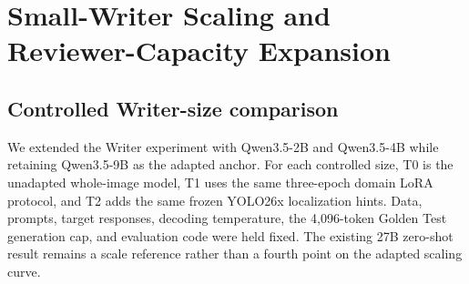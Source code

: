 
\section{Small-Writer Scaling and Reviewer-Capacity Expansion}

\subsection{Controlled Writer-size comparison}

We extended the Writer experiment with Qwen3.5-2B and Qwen3.5-4B while
retaining Qwen3.5-9B as the adapted anchor. For each controlled size, T0 is the
unadapted whole-image model, T1 uses the same three-epoch domain LoRA protocol,
and T2 adds the same frozen YOLO26x localization hints. Data, prompts, target
responses, decoding temperature, the 4,096-token Golden Test generation cap,
and evaluation code were held fixed. The existing 27B zero-shot result remains
a scale reference rather than a fourth point on the adapted scaling curve.

\begin{table}[H]
\centering
\scriptsize
\setlength{\tabcolsep}{2.0pt}
\caption{Controlled Writer-size results on the 1,000-image Golden Test. JSON,
Schema, Count, ID-F1, Cap.-F1, and Unsup. are percentages. Visual is the
independent model-based score in $[0,6]$. Unsup. is the unsupported-claim share,
not a human hallucination rate. A dash indicates that the frozen structured
evaluator could not define the metric from schema-invalid outputs.}
\label{tab:small-writer-results}
\end{table}

